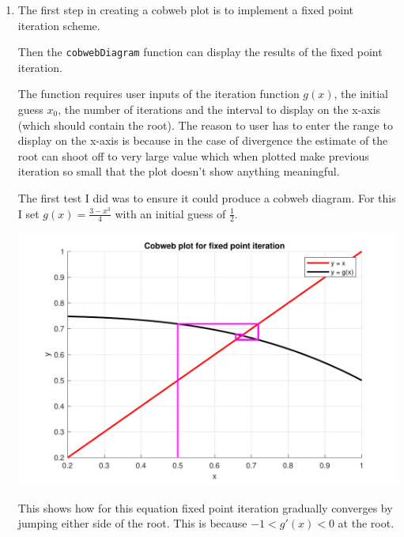 \documentclass[a4paper,11pt]{article}
\begin{document}
\begin{enumerate}
	
	\item The first step in creating a cobweb plot is to implement a fixed 
	point iteration scheme.
	
	Then the \verb*|cobwebDiagram| function can display the results of the 
	fixed point iteration.
	
	The function requires user inputs of the iteration function $g(x)$, 
	the initial guess $x_{0}$, the number of iterations and the interval to 
	display on the x-axis (which should contain the root). The reason to user 
	has to enter the range to display on the x-axis is because in the case of 
	divergence the estimate of the root can shoot off to very large value 
	which when plotted make previous iteration so small that the plot doesn't 
	show anything meaningful.
	
	The first test I did was to ensure it could produce a cobweb diagram. For 
	this I set $g(x) = \frac{3 - x^{3}}{4}$ with an initial guess of 
	$\frac{1}{2}$.
	
	\begin{center}
		\includegraphics[scale=0.6]{images/Q1d_cobweb.pdf}
	\end{center}
	This shows how for this equation fixed point iteration gradually 
	converges by jumping either 
	side of the root. This is because $-1<g'(x)<0$ at the root.


\end{enumerate}
\end{document}

